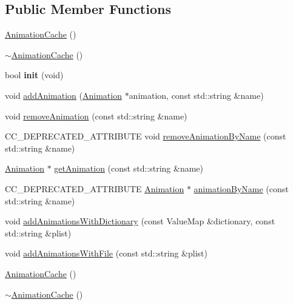 \subsection*{Public Member Functions}
\begin{DoxyCompactItemize}
\item 
\hyperlink{classAnimationCache_acaec76f854bdd38989b5a5a5e058fdf5}{Animation\+Cache} ()
\item 
\hyperlink{classAnimationCache_adfc3cbd2a736624fea3cb878494fd5a6}{$\sim$\+Animation\+Cache} ()
\item 
\mbox{\label{classAnimationCache_afee6353c3bf3219ca88dc6948746eaa5}} 
bool {\bfseries init} (void)
\item 
void \hyperlink{classAnimationCache_a520a7c0199b75c670195210fa79703d9}{add\+Animation} (\hyperlink{classAnimation}{Animation} $\ast$animation, const std\+::string \&name)
\item 
void \hyperlink{classAnimationCache_a7e3f77ac879a17a8418cdb80aebb2ca7}{remove\+Animation} (const std\+::string \&name)
\item 
C\+C\+\_\+\+D\+E\+P\+R\+E\+C\+A\+T\+E\+D\+\_\+\+A\+T\+T\+R\+I\+B\+U\+TE void \hyperlink{classAnimationCache_a67e8c52d54b5615c58c896eaa617a716}{remove\+Animation\+By\+Name} (const std\+::string \&name)
\item 
\hyperlink{classAnimation}{Animation} $\ast$ \hyperlink{classAnimationCache_ac9674f5e186bcec23f622cd62c1b873a}{get\+Animation} (const std\+::string \&name)
\item 
C\+C\+\_\+\+D\+E\+P\+R\+E\+C\+A\+T\+E\+D\+\_\+\+A\+T\+T\+R\+I\+B\+U\+TE \hyperlink{classAnimation}{Animation} $\ast$ \hyperlink{classAnimationCache_aaf38bd2ec7783124ebe9adfbb146bd23}{animation\+By\+Name} (const std\+::string \&name)
\item 
void \hyperlink{classAnimationCache_a7a67abb700f3f21efcb2f69ed44b886a}{add\+Animations\+With\+Dictionary} (const Value\+Map \&dictionary, const std\+::string \&plist)
\item 
void \hyperlink{classAnimationCache_a1b7464d9c2cd28731d099cb61aa46697}{add\+Animations\+With\+File} (const std\+::string \&plist)
\item 
\hyperlink{classAnimationCache_acaec76f854bdd38989b5a5a5e058fdf5}{Animation\+Cache} ()
\item 
\hyperlink{classAnimationCache_adfc3cbd2a736624fea3cb878494fd5a6}{$\sim$\+Animation\+Cache} ()
\item 
\mbox{\label{classAnimationCache_afee6353c3bf3219ca88dc6948746eaa5}} 

\end{DoxyCompactItemize}
